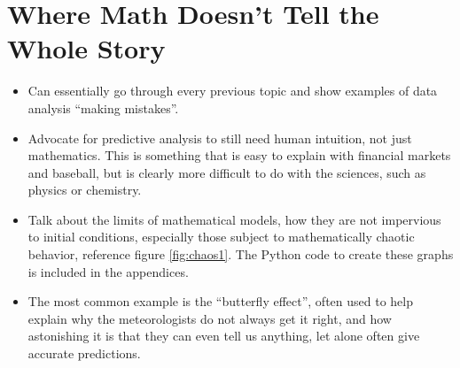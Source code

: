 \documentclass[../../fulltext/fulltext.tex]{subfiles}
\begin{document}
\chapter[When the Numbers Lie]{Where Math Doesn't Tell the Whole Story}
\begin{itemize}
	\item Can essentially go through every previous topic and show examples of data analysis ``making mistakes''.
	\item Advocate for predictive analysis to still need human intuition, not just mathematics.  This is something that is easy to explain with financial markets and baseball, but is clearly more difficult to do with the sciences, such as physics or chemistry.
	\item Talk about the limits of mathematical models, how they are not impervious to initial conditions, especially those subject to mathematically chaotic behavior, reference figure \ref{fig:chaos1}. The Python code to create these graphs is included in the appendices.
	\item The most common example is the \enquote{butterfly effect}, often used to help explain why the meteorologists do not always get it right, and how astonishing it is that they can even tell us anything, let alone often give accurate predictions.
\end{itemize}
\end{document}
